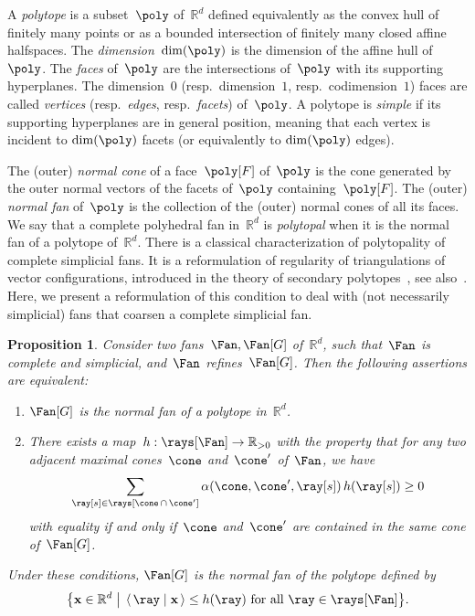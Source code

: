 \documentclass{amsart}
\newtheorem{proposition}[theorem]{Proposition}
\theoremstyle{definition}
\newcommand{\R}{\mathbb{R}} %
\renewcommand{\b}[1]{\mathbf{#1}} %
\newcommand{\bigset}[2]{\big\{ #1 \;\big|\; #2 \big\}} %
\newcommand{\dotprod}[2]{\left\langle \, #1 \; \middle| \; #2 \, \right\rangle} %
\newcommand{\darkblue}{\color{darkblue}} %
\newcommand{\defn}[1]{\textsl{\darkblue #1}} %
\newcommand{\coefficient}{\alpha} %
\begin{document}
A \defn{polytope} is a subset~$\poly$ of~$\R^d$ defined equivalently as the convex hull of finitely many points or as a bounded intersection of finitely many closed affine halfspaces.
The \defn{dimension}~$\dim(\poly)$ is the dimension of the affine hull of~$\poly$.
The \defn{faces} of~$\poly$ are the intersections of~$\poly$ with its supporting hyperplanes.
The dimension~$0$ (resp.~dimension~$1$, resp.~codimension~$1$) faces are called \defn{vertices} (resp.~\defn{edges}, resp.~\defn{facets}) of~$\poly$.
A polytope is \defn{simple} if its supporting hyperplanes are in general position, meaning that each vertex is incident to $\dim(\poly)$ facets (or equivalently to $\dim(\poly)$ edges).

The (outer) \defn{normal cone} of a face~$\poly[F]$ of~$\poly$ is the cone generated by the outer normal vectors of the facets of~$\poly$ containing~$\poly[F]$.
The (outer) \defn{normal fan} of~$\poly$ is the collection of the (outer) normal cones of all its faces.
We say that a complete polyhedral fan in~$\R^d$ is \defn{polytopal} when it is the normal fan of a polytope of~$\R^d$.
There is a classical characterization of polytopality of complete simplicial fans.
It is a reformulation of regularity of triangulations of vector configurations, introduced in the theory of secondary polytopes~\cite{GelfandKapranovZelevinsky}, see also~\cite{DeLoeraRambauSantos}.
Here, we present a reformulation of this condition to deal with (not necessarily simplicial) fans that coarsen a complete simplicial fan.

\begin{proposition}
\label{prop:polytopalSubfanFan}
Consider two fans~$\Fan, \Fan[G]$ of~$\R^d$, such that~$\Fan$ is complete and simplicial, and~$\Fan$ refines~$\Fan[G]$.
Then the following assertions are equivalent:
\begin{enumerate}
\item $\Fan[G]$ is the normal fan of a polytope in~$\R^d$.
\item There exists a map~$h: \rays[\Fan] \to \R_{> 0}$ with the property that for any two adjacent maximal cones~$\cone$ and~$\cone'$ of~$\Fan$, we have
\[
\sum_{\ray[s] \in \rays[\cone \,\cap\, \cone']} \coefficient(\cone, \cone', \ray[s]) \, h(\ray[s]) \ge 0
\]
with equality if and only if~$\cone$ and~$\cone'$ are contained in the same cone of~$\Fan[G]$.
\end{enumerate}
Under these conditions, $\Fan[G]$ is the normal fan of the polytope defined by
\[
\bigset{\b{x} \in \R^d}{\dotprod{\ray}{\b{x}} \le h(\ray) \text{ for all } \ray \in \rays[\Fan]}.
\]
\end{proposition}
\end{document}
